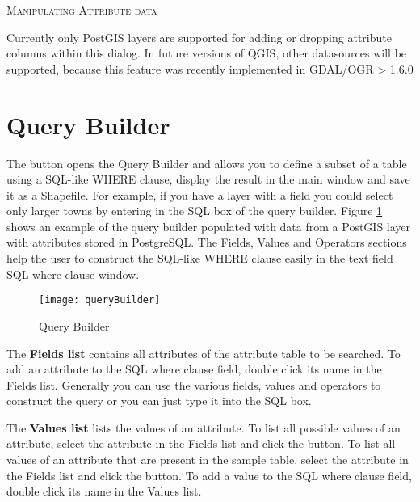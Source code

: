 \begin{Tip}\caption{\textsc{Manipulating Attribute data}}
Currently only PostGIS layers are supported for adding or dropping
attribute columns within this dialog. In future versions of QGIS, other
datasources will be supported, because this feature was recently implemented
in GDAL/OGR > 1.6.0
\end{Tip}

\section{Query Builder}\label{sec:query_builder}

The  button opens the Query Builder and allows you to 
define a subset of a table using a SQL-like WHERE clause, display the result in the 
main window and save it as a Shapefile. For example, if you have a 
 layer 
with a  field you could select only larger towns by entering
 in the SQL box of the query builder. Figure
\ref{fig:query_builder} shows an example of the query builder populated with
data from a PostGIS layer with attributes stored in PostgreSQL. 
The Fields, Values and Operators sections help the user to construct the SQL-like
WHERE clause easily in the text field SQL where clause window.


\begin{figure}[ht]
  \centering
    \caption{Query Builder \nixcaption}\label{fig:query_builder}
    \texttt{[image: queryBuilder]}
   \end{figure}

The \textbf{Fields list} contains all attributes of the attribute table to be 
searched. To add an attribute to the SQL where clause field, double click its 
name in the Fields list. Generally you can use the various fields, values and 
operators to construct the query or you can just type it into the SQL box. 

The \textbf{Values list} lists the values of an attribute. To list all possible 
values of an attribute, select the attribute in the Fields list and click the 
 button. To list all values 
of an attribute that are present in the sample table, select the attribute in 
the Fields list and click the  
button. To add a value to the SQL 
where clause field, double click its name in the Values list.   


